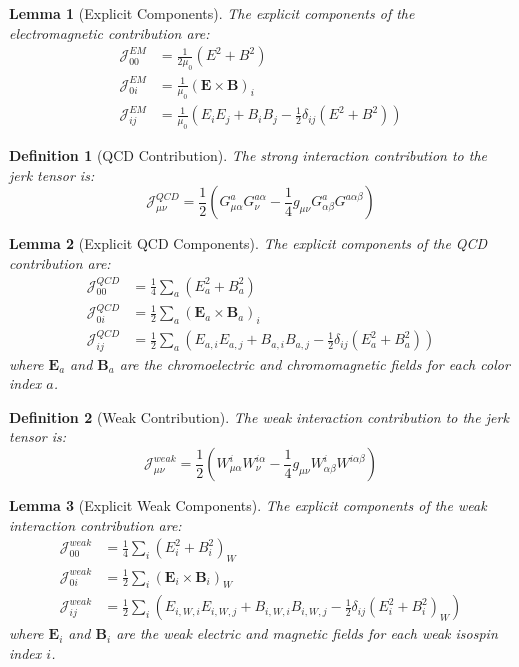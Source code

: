 \documentclass{article}
\newtheorem{lemma}{Lemma}
\newtheorem{definition}{Definition}
\begin{document}
\begin{lemma}[Explicit Components]
The explicit components of the electromagnetic contribution are:
\begin{align}
\mathcal{J}^{EM}_{00} &= \frac{1}{2\mu_0}(E^2 + B^2) \\
\mathcal{J}^{EM}_{0i} &= \frac{1}{\mu_0}(\mathbf{E} \times \mathbf{B})_i \\
\mathcal{J}^{EM}_{ij} &= \frac{1}{\mu_0}\left(E_i E_j + B_i B_j - \frac{1}{2}\delta_{ij}(E^2 + B^2)\right)
\end{align}
\end{lemma}

\begin{definition}[QCD Contribution]
The strong interaction contribution to the jerk tensor is:
\begin{equation}
\mathcal{J}^{QCD}_{\mu\nu} = \frac{1}{2}\left(G^a_{\mu\alpha}G^{a\alpha}_{\nu} - \frac{1}{4}g_{\mu\nu}G^a_{\alpha\beta}G^{a\alpha\beta}\right)
\end{equation}
\end{definition}

\begin{lemma}[Explicit QCD Components]
The explicit components of the QCD contribution are:
\begin{align}
\mathcal{J}^{QCD}_{00} &= \frac{1}{4}\sum_a(E_a^2 + B_a^2) \\
\mathcal{J}^{QCD}_{0i} &= \frac{1}{2}\sum_a(\mathbf{E}_a \times \mathbf{B}_a)_i \\
\mathcal{J}^{QCD}_{ij} &= \frac{1}{2}\sum_a\left(E_{a,i} E_{a,j} + B_{a,i} B_{a,j} - \frac{1}{2}\delta_{ij}(E_a^2 + B_a^2)\right)
\end{align}
where $\mathbf{E}_a$ and $\mathbf{B}_a$ are the chromoelectric and chromomagnetic fields for each color index $a$.
\end{lemma}

\begin{definition}[Weak Contribution]
The weak interaction contribution to the jerk tensor is:
\begin{equation}
\mathcal{J}^{weak}_{\mu\nu} = \frac{1}{2}\left(W^i_{\mu\alpha}W^{i\alpha}_{\nu} - \frac{1}{4}g_{\mu\nu}W^i_{\alpha\beta}W^{i\alpha\beta}\right)
\end{equation}
\end{definition}

\begin{lemma}[Explicit Weak Components]
The explicit components of the weak interaction contribution are:
\begin{align}
\mathcal{J}^{weak}_{00} &= \frac{1}{4}\sum_i(E_i^2 + B_i^2)_W \\
\mathcal{J}^{weak}_{0i} &= \frac{1}{2}\sum_i(\mathbf{E}_i \times \mathbf{B}_i)_W \\
\mathcal{J}^{weak}_{ij} &= \frac{1}{2}\sum_i\left(E_{i,W,i} E_{i,W,j} + B_{i,W,i} B_{i,W,j} - \frac{1}{2}\delta_{ij}(E_i^2 + B_i^2)_W\right)
\end{align}
where $\mathbf{E}_i$ and $\mathbf{B}_i$ are the weak electric and magnetic fields for each weak isospin index $i$.
\end{lemma}
\end{document}
